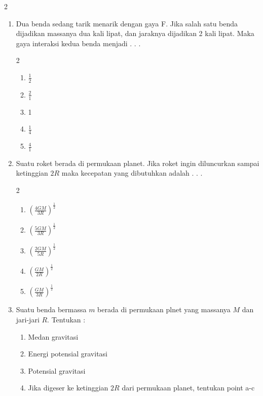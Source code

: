 \documentclass[10pt,a4paper]{article}
\newcommand{\pilgani}[1]{                            \vspace{-0.3cm}\begin{multicols}{2}
 \begin{enumerate}[label=\Alph*., itemsep=0pt,topsep=0pt,leftmargin=*,align=Center]#1                     \end{enumerate}
 \phantom{ini cuma sapi, wedus, dan ayam}
 \end{multicols}}
\begin{document}
\begin{multicols*}{2}
\begin{enumerate}
\item Dua benda sedang tarik menarik dengan gaya F. Jika salah satu benda dijadikan massanya dua kali lipat, dan jaraknya dijadikan 2 kali lipat. Maka gaya interaksi kedua benda menjadi  . . . 
\pilgani{
    \item $\frac{1}{2}$
    \item $\frac{2}{1}$
    \item 1
    \item $\frac{1}{4}$
    \item $\frac{4}{1}$
}
\vspace{3cm}

\item Suatu roket berada di permukaan planet. Jika roket ingin diluncurkan sampai ketinggian $2R$ maka kecepatan yang dibutuhkan adalah . . . 
\pilgani{
    \item $\left ( \frac{4GM}{3R} \right )^{\frac{1}{2}}$
    \item $\left ( \frac{5GM}{3R} \right )^{\frac{1}{2}}$
    \item $\left ( \frac{2GM}{5R} \right )^{\frac{1}{2}}$
    \item $\left ( \frac{GM}{2R} \right )^{\frac{1}{2}}$
    \item $\left ( \frac{GM}{3R} \right )^{\frac{1}{2}}$
}
\vspace{3cm}



\item Suatu benda bermassa $m$ berada di permukaan plnet yang massanya $M$ dan jari-jari $R$. Tentukan :
\begin{enumerate}[label=\alph*]
    \item Medan gravitasi
    \item Energi potensial gravitasi
    \item Potensial gravitasi
    \item Jika digeser ke ketinggian $2R$ dari permukaan planet, tentukan point a-c
    \end{enumerate}
    
\end{enumerate}

\end{multicols*}


 
\end{document}
